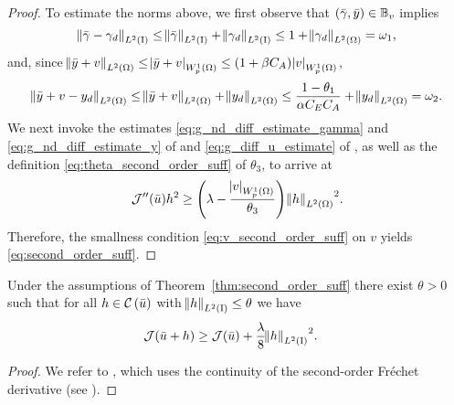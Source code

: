 \documentclass[final]{siamltex}
\begin{document}
\begin{proof}
To estimate the norms above, we first observe that $\del{{\bar{\gamma}}, {\bar{y}}}\in {\mathbb{B}}_v$
implies
\begin{equation*}
    	{\norm{{{\bar{\gamma}}-\gamma_d}}_{{L^2\del{{{\text{\rm I}}}}}}}  
		\le {\norm{\bar{\gamma}}_{{L^2\del{{{\text{\rm I}}}}}}} + {\norm{{\gamma_d}}_{{L^2\del{{{\text{\rm I}}}}}}} \le 1 
                + {\norm{{\gamma_d}}_{{L^2\del{{\Omega}}}}} = \omega_1,
\end{equation*}
and, since ${\norm{{{\bar{y}}+v}}_{{L^2\del{{{\Omega}}}}}} \le
{\abs{{{\bar{y}}+v}}_{{W^{{{1}}}_{{{p}}}\del{{{\Omega}}}}}}\le \del{1+\beta C_A} {\abs{{v}}_{{W^{{1}}_{{p}}\del{{\Omega}}}}}$,
\begin{equation*}
    	{\norm{{{\bar{y}}+v-y_d}}_{{L^2\del{{\Omega}}}}} 
                \le {\norm{{{\bar{y}}+v}}_{{L^2\del{{{\Omega}}}}}} + {\norm{{y_d}}_{{L^2\del{{\Omega}}}}}
                \le \frac{1-\theta_1}{\alpha C_E C_A} + {\norm{{y_d}}_{{L^2\del{{\Omega}}}}}
                = \omega_2.
\end{equation*}
We next invoke the estimates
\eqref{eq:g_nd_diff_estimate_gamma} and
\eqref{eq:g_nd_diff_estimate_y} of  and
\eqref{eq:g_diff_u_estimate} of , as well as
the definition \eqref{eq:theta_second_order_suff} of $\theta_3$,
to arrive at
\[
    		{\mathcal{J}}''({\bar{u}})h^2  \ge \del{\lambda -
                  \frac{{\abs{{v}}_{{W^{{1}}_{{p}}\del{{\Omega}}}}}}{\theta_3} }
                {\norm{{h}}_{{L^2\del{{\Omega}}}}}^2.
\]
Therefore, the smallness condition \eqref{eq:v_second_order_suff} on
$v$ yields \eqref{eq:second_order_suff}. 
\end{proof}
\begin{corollary}  \label{cor:quad_growth_cond}
Under the assumptions of Theorem~\ref{thm:second_order_suff}
there exist $\theta > 0$ such that 
for all $h \in {{\mathcal C\del{{\bar{u}}}}}$ with ${\norm{{h}}_{{L^2\del{{{\text{\rm I}}}}}}} \le \theta$ we have
\begin{align} \label{eq:J_quad_growth}
	{\mathcal{J}}({\bar{u}} + h) &\ge {\mathcal{J}}({\bar{u}}) + \frac{\lambda}{8} {\norm{{h}}_{{L^2\del{{{\text{\rm I}}}}}}}^2 .
\end{align}
\end{corollary}
\begin{proof}
We refer to \cite[Theorem 4.23]{FTroltzsch_2010a}, which uses the 
continuity of the second-order Fr\'echet derivative (see ). 
\end{proof}
\end{document}
